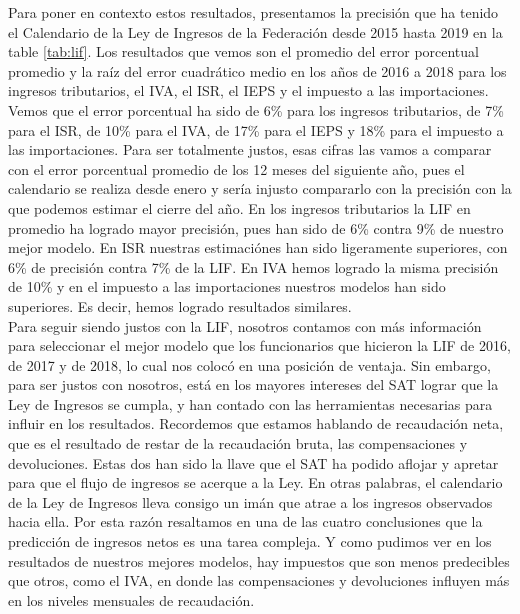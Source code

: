 \documentclass[a4paper, 11pt]{article}
\begin{document}
Para poner en contexto estos resultados, presentamos la precisión que ha tenido el Calendario de la Ley de Ingresos de la Federación desde 2015 hasta 2019 en la table \ref{tab:lif}. Los resultados que vemos son el promedio del error porcentual promedio y  la raíz del error cuadrático medio en los años de 2016 a 2018 para los ingresos tributarios, el IVA, el ISR, el IEPS y el impuesto a las importaciones. Vemos que el error porcentual ha sido de 6\% para los ingresos tributarios, de 7\% para el ISR, de 10\% para el IVA,  de 17\% para el IEPS y 18\% para el impuesto a las importaciones. Para ser totalmente justos, esas cifras las vamos a comparar con el error porcentual promedio de los 12 meses del siguiente año, pues el calendario se realiza desde enero y sería injusto compararlo con la precisión con la que podemos estimar el cierre del año. En los ingresos tributarios la LIF en promedio ha logrado mayor precisión, pues han sido de 6\% contra 9\% de nuestro mejor modelo. En ISR nuestras estimaciónes  han sido ligeramente superiores, con 6\% de precisión contra 7\% de la LIF. En IVA hemos logrado la misma precisión de 10\% y en el impuesto a las importaciones nuestros modelos han sido superiores. Es decir, hemos logrado resultados similares.\\

Para seguir siendo justos con la LIF, nosotros contamos con más información para seleccionar el mejor modelo que los funcionarios que hicieron la LIF de 2016, de 2017 y de 2018, lo cual nos colocó en una posición de ventaja. Sin embargo, para ser justos con nosotros, está en los mayores intereses del SAT lograr que la Ley de Ingresos se cumpla, y han contado con las herramientas necesarias para influir en los resultados. Recordemos que estamos hablando de recaudación neta, que es el resultado de restar de la recaudación bruta, las compensaciones y devoluciones. Estas dos han sido la llave que el SAT ha podido aflojar y apretar para que el flujo de ingresos se acerque a la Ley. En otras palabras, el calendario de la Ley de Ingresos lleva consigo un imán que atrae a los ingresos observados hacia ella. Por esta razón resaltamos en una de las cuatro conclusiones que la predicción de ingresos netos es una tarea compleja. Y como pudimos ver en los resultados de nuestros mejores modelos, hay impuestos que son menos predecibles que otros, como el IVA, en donde las compensaciones y devoluciones influyen más en los niveles mensuales de recaudación.
\end{document}
